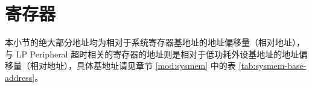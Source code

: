 \documentclass[main\_\_CN.tex]{subfiles}
\begin{document}


\clearpage
\section{寄存器}

本小节的绝大部分地址均为相对于系统寄存器基地址的地址偏移量（相对地址），与 LP Peripheral 超时相关的寄存器的地址则是相对于低功耗外设基地址的地址偏移量（相对地址），具体基地址请见章节 \ref{mod:sysmem} \textit{} 中的表 \ref{tab:sysmem-base-address}。



\end{document}
